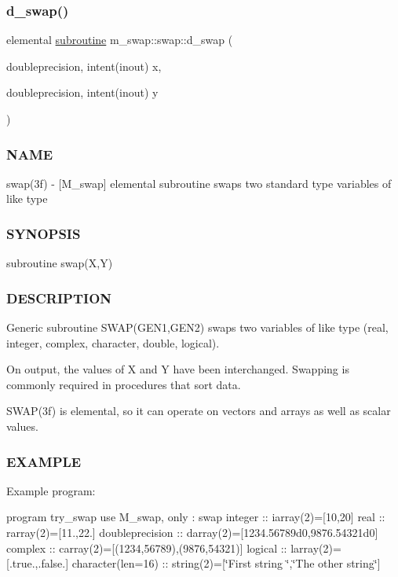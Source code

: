 \subsubsection{\texorpdfstring{d\+\_\+swap()}{d\_swap()}}
{\footnotesize\ttfamily elemental \hyperlink{M__stopwatch_83_8txt_acfbcff50169d691ff02d4a123ed70482}{subroutine} m\+\_\+swap\+::swap\+::d\+\_\+swap (\begin{DoxyParamCaption}\item[{doubleprecision, intent(inout)}]{x,  }\item[{doubleprecision, intent(inout)}]{y }\end{DoxyParamCaption})\hspace{0.3cm}{\ttfamily [private]}}



\subsubsection*{N\+A\+ME}

swap(3f) -\/ \mbox{[}M\+\_\+swap\mbox{]} elemental subroutine swaps two standard type variables of like type \subsubsection*{S\+Y\+N\+O\+P\+S\+IS}

subroutine swap(\+X,\+Y) \subsubsection*{D\+E\+S\+C\+R\+I\+P\+T\+I\+ON}

Generic subroutine S\+W\+A\+P(\+G\+E\+N1,\+G\+E\+N2) swaps two variables of like type (real, integer, complex, character, double, logical).

On output, the values of X and Y have been interchanged. Swapping is commonly required in procedures that sort data.

S\+W\+A\+P(3f) is elemental, so it can operate on vectors and arrays as well as scalar values.

\subsubsection*{E\+X\+A\+M\+P\+LE}

Example program\+:

program try\+\_\+swap use M\+\_\+swap, only \+: swap integer \+:\+: iarray(2)=\mbox{[}10,20\mbox{]} real \+:\+: rarray(2)=\mbox{[}11.,22.\mbox{]} doubleprecision \+:\+: darray(2)=\mbox{[}1234.\+56789d0,9876.\+54321d0\mbox{]} complex \+:\+: carray(2)=\mbox{[}(1234,56789),(9876,54321)\mbox{]} logical \+:\+: larray(2)=\mbox{[}.true.,.false.\mbox{]} character(len=16) \+:\+: string(2)=\mbox{[}\char`\"{}\+First string    \char`\"{},\char`\"{}\+The other string\char`\"{}\mbox{]}


